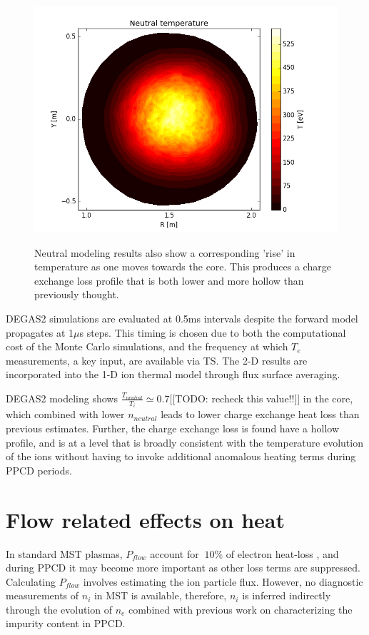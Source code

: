 \documentclass[aip, pop, preprint]{revtex4-1}
\begin{document}
\begin{figure}
	\centering
	\includegraphics[width = 1.\linewidth]{./plots/degas_neutral_t}
	\label{fig:DEGAS2_2d_temp}
	\caption{Neutral modeling results also show a corresponding 'rise' in temperature as one moves towards the core. This produces a charge exchange loss profile that is both lower and more hollow than previously thought.}
	\label{fig:DEGAS2_2D}
\end{figure}

DEGAS2 simulations are evaluated at 0.5ms intervals despite the forward model propagates at 1$\mu$s steps.  This timing is chosen due to both the  computational cost of the Monte Carlo simulations, and the frequency at which $ T_e $ measurements, a key input, are available via TS. The 2-D results are incorporated into the 1-D ion thermal model through flux surface averaging.

DEGAS2 modeling shows $\frac{T_{neutral}}{T_{i}} \simeq 0.7$[[TODO: recheck this value!!]] in the core, which combined with lower $ n_{neutral} $ leads to lower charge exchange heat loss than previous estimates. Further, the charge exchange loss is found have a hollow profile, and is at a level that is broadly consistent with the temperature evolution of the ions without having to invoke additional anomalous heating terms during PPCD periods. 

\section{Flow related effects on heat}\label{flow_effects}

In standard MST plasmas, $P_{flow}$ account for $ ~10\% $ of electron heat-loss \cite{BiewerThesis}, and during PPCD it may become more important as other loss terms are suppressed. Calculating $P_{flow}$ involves estimating the ion particle flux.  However, no diagnostic measurements of $n_i$ in MST is available, therefore, $n_i$ is inferred indirectly through the evolution of $n_e$ combined with previous work on characterizing the impurity content in PPCD\cite{Kumar12pop,Nornberg18FST}.
\end{document}
